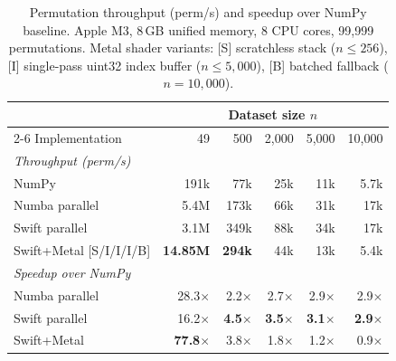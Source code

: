 \documentclass[12pt]{article}
\begin{document}
\begin{table}[ht]
\centering
\small
\caption{
  Permutation throughput (perm/s) and speedup over NumPy baseline.
  Apple M3, 8\,GB unified memory, 8 CPU cores, 99,999 permutations.
  Metal shader variants: [S] scratchless stack ($n \leq 256$),
  [I] single-pass uint32 index buffer ($n \leq 5{,}000$),
  [B] batched fallback ($n = 10{,}000$).
}
\label{tab:results}
\begin{tabular}{lrrrrr}
\toprule
& \multicolumn{5}{c}{Dataset size $n$} \\
\cmidrule(lr){2-6}
Implementation & 49 & 500 & 2,000 & 5,000 & 10,000 \\
\midrule
\multicolumn{6}{l}{\textit{Throughput (perm/s)}} \\[2pt]
NumPy           & 191k  & 77k   & 25k   & 11k   & 5.7k  \\
Numba parallel  & 5.4M  & 173k  & 66k   & 31k   & 17k   \\
Swift parallel  & 3.1M  & 349k  & 88k   & 34k   & 17k   \\
Swift+Metal [S/I/I/I/B] & \textbf{14.85M} & \textbf{294k} & 44k & 13k & 5.4k \\
\midrule
\multicolumn{6}{l}{\textit{Speedup over NumPy}} \\[2pt]
Numba parallel  & 28.3$\times$ & 2.2$\times$ & 2.7$\times$ & 2.9$\times$ & 2.9$\times$ \\
Swift parallel  & 16.2$\times$ & \textbf{4.5$\times$} & \textbf{3.5$\times$} & \textbf{3.1$\times$} & \textbf{2.9$\times$} \\
Swift+Metal     & \textbf{77.8$\times$} & 3.8$\times$ & 1.8$\times$ & 1.2$\times$ & 0.9$\times$ \\
\bottomrule
\end{tabular}
\end{table}
\end{document}

